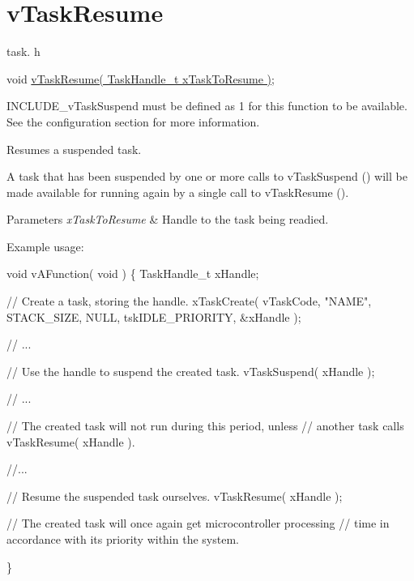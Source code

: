 \hypertarget{group__v_task_resume}{}\section{v\+Task\+Resume}
\label{group__v_task_resume}
task. h 
\begin{DoxyPre}void \hyperlink{task_8h_a84a1584f29fb7736a1aa72ad5b3e9b44}{vTaskResume( TaskHandle\_t xTaskToResume )};\end{DoxyPre}


I\+N\+C\+L\+U\+D\+E\+\_\+v\+Task\+Suspend must be defined as 1 for this function to be available. See the configuration section for more information.

Resumes a suspended task.

A task that has been suspended by one or more calls to v\+Task\+Suspend () will be made available for running again by a single call to v\+Task\+Resume ().


\begin{DoxyParams}{Parameters}
{\em x\+Task\+To\+Resume} & Handle to the task being readied.\\
\hline
\end{DoxyParams}
Example usage\+: 
\begin{DoxyPre}
void vAFunction( void )
\{
TaskHandle\_t xHandle;
\begin{DoxyVerb}// Create a task, storing the handle.
xTaskCreate( vTaskCode, "NAME", STACK_SIZE, NULL, tskIDLE_PRIORITY, &xHandle );

// ...

// Use the handle to suspend the created task.
vTaskSuspend( xHandle );

// ...

// The created task will not run during this period, unless
// another task calls vTaskResume( xHandle ).

//...


// Resume the suspended task ourselves.
vTaskResume( xHandle );

// The created task will once again get microcontroller processing
// time in accordance with its priority within the system.
\end{DoxyVerb}

\}
  \end{DoxyPre}
 
